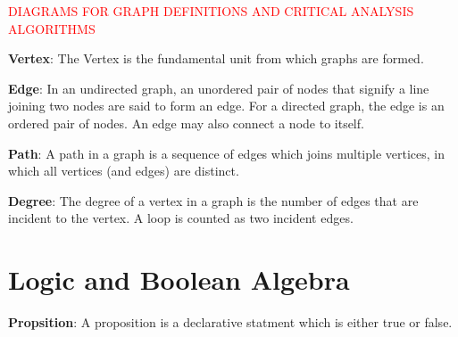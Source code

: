 \textcolor{red} {DIAGRAMS FOR GRAPH DEFINITIONS  AND CRITICAL ANALYSIS ALGORITHMS}
\begin{defn}\label{mod1:defn:Vertex}
	\textbf{Vertex}: The Vertex is the fundamental unit from which graphs are formed.
\end{defn}

\begin{defn}\label{mod1:defn:Edge}
	\textbf{Edge}: In an undirected graph, an unordered pair of nodes that signify  a line joining  two nodes are said to form an edge. For a directed graph, the edge is an ordered pair of nodes. An edge may also connect a node to itself.
\end{defn}

\begin{defn}\label{mod1:defn:Path}
	 \textbf{Path}: A path in a graph is a sequence of edges which joins multiple vertices, in which all vertices (and edges) are distinct.
\end{defn}

\begin{defn}\label{mod1:defn:Degree}
	\textbf{Degree}: The degree of a vertex  in a graph is the number of edges that are incident to the vertex. A loop is counted as two incident edges.
\end{defn}


\section{Logic and Boolean Algebra}

\begin{defn}\label{mod1:defn:Proposition}
	\textbf{Propsition}: A proposition is a declarative statment which is either true or false.
\end{defn}

